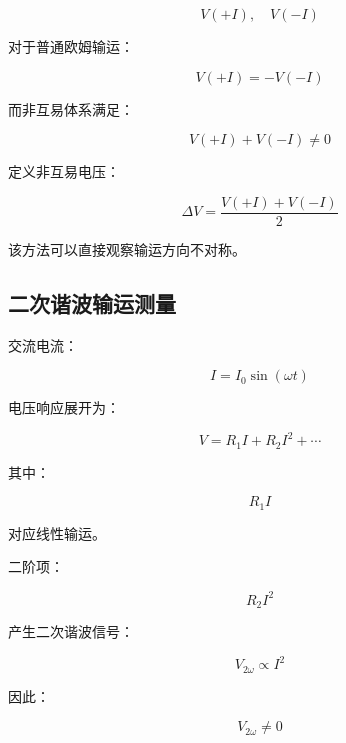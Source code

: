 \documentclass[10.5pt]{article}
\begin{document}
\begin{equation}
V(+I),\quad V(-I)
\end{equation}


对于普通欧姆输运：

\begin{equation}
V(+I)=-V(-I)
\end{equation}


而非互易体系满足：

\begin{equation}
V(+I)+V(-I)\neq0
\end{equation}


定义非互易电压：

\begin{equation}
\Delta V=
\frac{V(+I)+V(-I)}{2}
\end{equation}


该方法可以直接观察输运方向不对称。



\subsection{二次谐波输运测量}


交流电流：

\begin{equation}
I=I_0\sin(\omega t)
\end{equation}


电压响应展开为：

\begin{equation}
V=
R_1I+R_2I^2+\cdots
\end{equation}


其中：

\begin{equation}
R_1I
\end{equation}

对应线性输运。


二阶项：

\begin{equation}
R_2I^2
\end{equation}

产生二次谐波信号：

\begin{equation}
V_{2\omega}\propto I^2
\end{equation}


因此：

\begin{equation}
V_{2\omega}\neq0
\end{equation}
\end{document}

